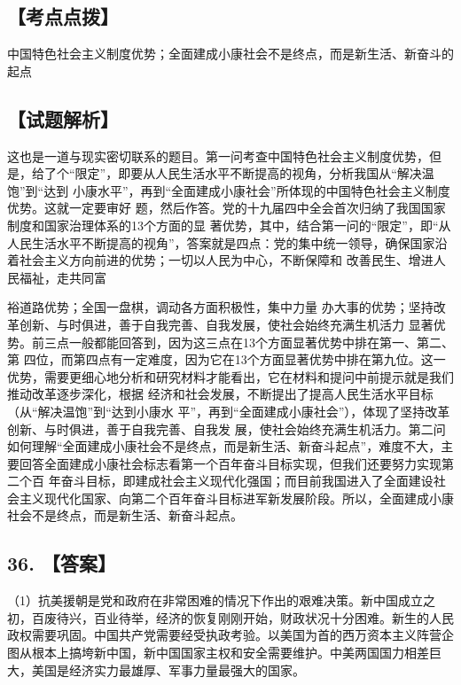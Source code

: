 \documentclass[UTF8,11pt]{ctexart}
\begin{document}
\subsection*{【考点点拨】}

中国特色社会主义制度优势；全面建成小康社会不是终点，而是新生活、新奋斗的起点


\subsection*{【试题解析】}

这也是一道与现实密切联系的题目。第一问考查中国特色社会主义制度优势，但是，给了个“限定”，即要从人民生活水平不断提高的视角，分析我国从“解决温饱”到“达到 小康水平”，再到“全面建成小康社会”所体现的中国特色社会主义制度优势。这就一定要审好 题，然后作答。党的十九届四中全会首次归纳了我国国家制度和国家治理体系的13个方面的显 著优势，其中，结合第一问的“限定”，即“从人民生活水平不断提高的视角”，答案就是四点：党的集中统一领导，确保国家沿着社会主义方向前进的优势；一切以人民为中心，不断保障和 改善民生、增进人民福祉，走共同富


裕道路优势；全国一盘棋，调动各方面积极性，集中力量 办大事的优势；坚持改革创新、与时俱进，善于自我完善、自我发展，使社会始终充满生机活力 显著优势。前三点一般都能回答到，因为这三点在13个方面显著优势中排在第一、第二、第 四位，而第四点有一定难度，因为它在13个方面显著优势中排在第九位。这一优势，需要更细心地分析和研究材料才能看出，它在材料和提问中前提示就是我们推动改革逐步深化，根据 经济和社会发展，不断提出了提高人民生活水平目标（从“解决温饱”到“达到小康水 平”，再到“全面建成小康社会”），体现了坚持改革创新、与时俱进，善于自我完善、自我发 展，使社会始终充满生机活力。第二问如何理解“全面建成小康社会不是终点，而是新生活、新奋斗起点”，难度不大，主要回答全面建成小康社会标志看第一个百年奋斗目标实现，但我们还要努力实现第二个百 年奋斗目标，即建成社会主义现代化强国；而目前我国进入了全面建设社会主义现代化国家、向第二个百年奋斗目标进军新发展阶段。所以，全面建成小康社会不是终点，而是新生活、新奋斗起点。


\subsection*{36. 【答案】}

（1）抗美援朝是党和政府在非常困难的情况下作出的艰难决策。新中国成立之初，百废待兴，百业待举，经济的恢复刚刚开始，财政状况十分困难。新生的人民政权需要巩固。中国共产党需要经受执政考验。以美国为首的西万资本主义阵营企图从根本上搞垮新中国，新中国国家主权和安全需要维护。中美两国国力相差巨大，美国是经济实力最雄厚、军事力量最强大的国家。
\end{document}
